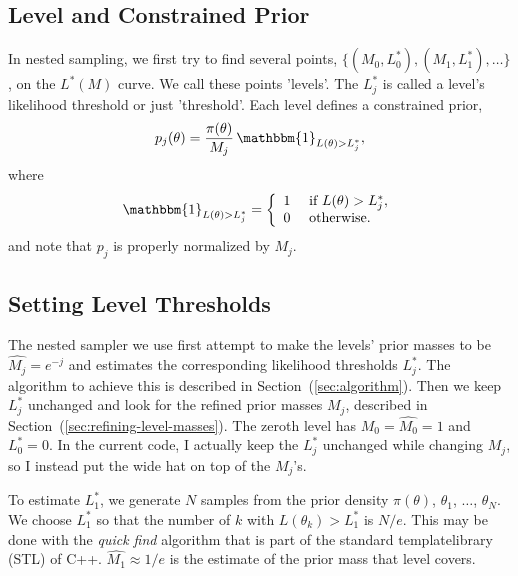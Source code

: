 \documentclass[letterpaper, preprint]{aastex}
\newcommand{\qer}[1]{{\color{red}#1}}
\begin{document}
\subsection{Level and Constrained Prior}
In nested sampling, we first try to find several points, $\{(M_0, L_0^*),(M_1,L_1^*),\ldots\}$, on the $L^*(M)$ curve. We call these points 'levels'. The $L^*_j$ is called a level's likelihood threshold or just 'threshold'. Each level defines a constrained prior,
\begin{equation} 
p_{j}(\theta) = \frac{\pi(\theta)}{M_j}\,\mathbbm{1}_{L(\theta)>L_j^*},
\label{eq:constrained-prior}
\end{equation}
where
\begin{eqnarray*}
\mathbbm{1}_{L(\theta)>L_j^*} = \left\{ \begin{array}{ll}
               1 & \mbox{ if } L(\theta)>L_j^*,\\
               0 & \mbox{ otherwise.} \end{array}  \right.
\end{eqnarray*}
and note that $p_{j}$ is properly normalized by $M_j$. 

\subsection{Setting Level Thresholds}
\label{sec:constructing}
The nested sampler we use first attempt to make the levels' prior masses to be $\widehat{M_j} = e^{-j}$ and estimates the corresponding likelihood thresholds $L^*_j$. The algorithm to achieve this is described in Section~(\ref{sec:algorithm}). Then we keep $L^*_j$ unchanged and look for the refined prior masses $M_j$, described in Section~(\ref{sec:refining-level-masses}). The zeroth level has $M_0 =\widehat{M_0}= 1$ and $L^*_0 = 0$. \qer{In the current code, I actually keep the $L^*_j$ unchanged while changing $M_j$, so I instead put the wide hat on top of the $M_j$'s.}

To estimate $L^*_1$, we generate $N$ samples from the prior density $\pi(\theta)$, $\theta_1$, $\ldots$, $\theta_N$. We choose $L^*_1$ so that the number of $k$ with $L(\theta_k) > L^*_1$ is $N/e$. This may be done with the {\em quick find} algorithm that is part of the standard templatelibrary (STL) of C++. $\widehat{M_1}\approx1/e$ is the estimate of the prior mass that level  covers. 
\end{document}
